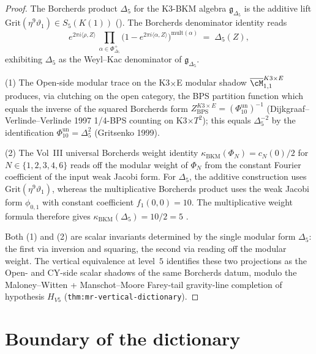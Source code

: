 \begin{proof}
The Borcherds product $\Delta_5$ for the K3-BKM algebra
$\mathfrak g_{\Delta_5}$ is the additive lift
$\mathrm{Grit}(\eta^9 \vartheta_1) \in S_5(K(1))$
\textup{(}\cite[Thm.~6.1]{Gritsenko1999}\textup{).} The Borcherds
denominator identity reads
\[
e^{2\pi i \langle \rho, Z\rangle}\,
\prod_{\alpha \in \Phi^+_{\Delta_5}}
\bigl(1 - e^{2\pi i \langle \alpha, Z\rangle}\bigr)^{\mathrm{mult}(\alpha)}
\;=\;\Delta_5(Z),
\]
exhibiting $\Delta_5$ as the Weyl--Kac denominator of
$\mathfrak g_{\Delta_5}$.

\textup{(}1\textup{)} The Open-side modular trace on the K3$\times$E
modular shadow $\overline{\cM}_{1, 1}^{K3\times E}$ produces, via
clutching on the open category, the BPS partition function which
equals the inverse of the squared Borcherds form
$Z_{\mathrm{BPS}}^{K3 \times E} = (\Phi_{10}^{\mathrm{un}})^{-1}$
\textup{(}Dijkgraaf--Verlinde--Verlinde 1997 1/4-BPS counting on
K3$\times T^2$\textup{);} this equals $\Delta_5^{-2}$ by the
identification $\Phi_{10}^{\mathrm{un}} = \Delta_5^2$
\textup{(}Gritsenko 1999\textup{).}

\textup{(}2\textup{)} The Vol~III universal Borcherds weight identity
$\kappa_{\mathrm{BKM}}(\Phi_N) = c_N(0)/2$ for $N \in \{1, 2, 3, 4, 6\}$
reads off the modular weight of $\Phi_N$ from the constant Fourier
coefficient of the input weak Jacobi form. For
$\Delta_5$, the additive construction uses
$\mathrm{Grit}(\eta^9\vartheta_1)$, whereas the multiplicative
Borcherds product uses the weak Jacobi form $\phi_{0,1}$ with
constant coefficient $f_1(0,0)=10$.  The multiplicative weight formula
therefore gives
$\kappa_{\mathrm{BKM}}(\Delta_5)=10/2=5$
\cite[Example~2.4, equation~(2.16)]{GritsenkoNikulin1998}.

Both \textup{(1)} and \textup{(2)} are scalar invariants determined
by the single modular form $\Delta_5$: the first via inversion and
squaring, the second via reading off the modular weight. The vertical
equivalence at level~$5$ identifies these two projections as the
Open- and CY-side scalar shadows of the same Borcherds datum, modulo
the Maloney--Witten + Manschot--Moore Farey-tail gravity-line
completion of hypothesis $H_{V5}$
\textup{(}\texttt{thm:mr-vertical-dictionary}\textup{).}
\end{proof}

\section{Boundary of the dictionary}
\label{sec:master-concordance-boundary}

